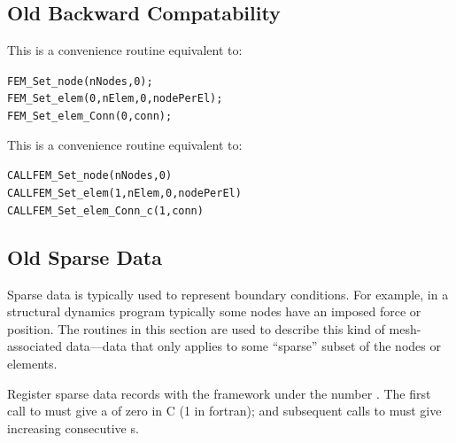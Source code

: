 \subsection{Old Backward Compatability}

     This is a convenience routine equivalent to:
\begin{alltt}
          FEM\_Set\_node(nNodes,0);
          FEM\_Set\_elem(0,nElem,0,nodePerEl);
          FEM\_Set\_elem\_Conn(0,conn);
\end{alltt}


     This is a convenience routine equivalent to:
\begin{alltt}
          CALL FEM\_Set\_node(nNodes,0)
          CALL FEM\_Set\_elem(1,nElem,0,nodePerEl)
          CALL FEM\_Set\_elem\_Conn\_c(1,conn)
\end{alltt}


\subsection{Old Sparse Data}

Sparse data is typically used to represent boundary conditions.  For
example, in a structural dynamics program typically some nodes have 
an imposed force or position.  The routines in this section are 
used to describe this kind of mesh-associated data---data that only 
applies to some ``sparse'' subset of the nodes or elements.  



Register  sparse data records with the framework under the number . 
The first call to  must give a  of zero in C (1 in fortran);
and subsequent calls to  must give increasing consecutive s.

